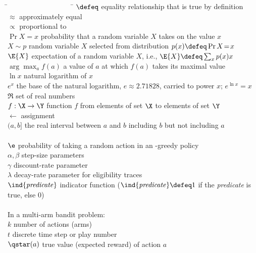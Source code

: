 \begin{tabbing}
\=~~~~~~~~~~~~~~~~~~  \= \kill
\>$\defeq$            \> equality relationship that is true by definition\\
\>$\approx$           \> approximately equal\\
\>$\propto$           \> proportional to\\
\>$\Pr{X\!=\!x}$      \> probability that a random variable $X$ takes on the value $x$\\
\>$X\sim p$           \> random variable $X$ selected from distribution $p(x)\defeq\Pr{X\!=\!x}$\\
\>$\E{X}$             \> expectation of a random variable $X$, i.e., $\E{X}\defeq\sum_x p(x)x$\\
\>$\arg\max_a f(a)$   \> a value of $a$ at which $f(a)$ takes its maximal value\\
\>$\ln x$             \> natural logarithm of $x$\\
\>$e^x$               \> the base of the natural logarithm, $e\approx 2.71828$, carried to power $x$; $e^{\ln x}=x$\\
\>$\Re$               \> set of real numbers\\
\>$f:\X\rightarrow\Y$ \> function $f$ from elements of set $\X$ to elements of set $\Y$\\
\>$\leftarrow$        \> assignment\\
\>$(a,b]$             \> the real interval between $a$ and $b$ including $b$ but not including $a$\\
\\
\>$\e$                \> probability of taking a random action in an \e-greedy policy\\
\>$\alpha, \beta$     \> step-size parameters\\
\>$\gamma$            \> discount-rate parameter\\
\>$\lambda$           \> decay-rate parameter for eligibility traces\\
\>$\ind{\text{\emph{predicate}}}$ \>indicator function ($\ind{\text{\emph{predicate}}}\defeq1$ if the \emph{predicate} is true, else 0)\\
\\
\>In a multi-arm bandit problem:\\
\>$k$                 \> number of actions (arms)\\
\>$t$                 \> discrete time step or play number\\
\>$\qstar(a)$         \> true value (expected reward) of action $a$\\

\end{tabbing}
